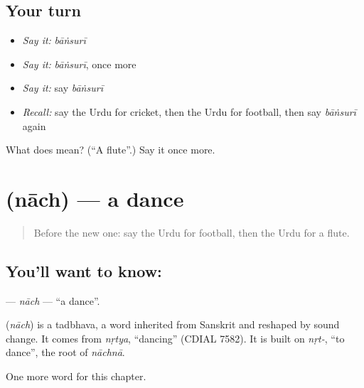 \subsection*{Your turn}
\begin{itemize}
\raggedright
  \item \emph{Say it:} \emph{bāṅsurī}
  \item \emph{Say it:} \emph{bāṅsurī}, once more
  \item \emph{Say it:} say \emph{bāṅsurī}
  \item \emph{Recall:} say the Urdu for cricket, then the Urdu for football, then say \emph{bāṅsurī} again
\end{itemize}

\begin{tcolorbox}[breakable,colback=teal!4,colframe=teal!35!black,title={Before you move on}]
What does  mean? (\textquotedblleft{}A flute\textquotedblright{}.) Say it once more.
\end{tcolorbox}
\section[\texorpdfstring{\ur{ناچ} (nāch)}{ناچ (nāch)}]{ (nāch) — a dance}

\label{lesson:UR-C169-nach}



\begin{quote}
Before the new one: say the Urdu for football, then the Urdu for a flute.
\end{quote}

\subsection*{You'll want to know: }
\textbf{} — \emph{nāch} — \textquotedblleft{}a dance\textquotedblright{}.

\begin{cousinweb}
\textbf{} (\emph{nāch}) is a tadbhava, a word inherited from Sanskrit and reshaped by sound change. It comes from \emph{nṛtya}, \textquotedblleft{}dancing\textquotedblright{} (CDIAL 7582). It is built on \emph{nṛt-}, \textquotedblleft{}to dance\textquotedblright{}, the root of \emph{nāchnā}.
\end{cousinweb}

\begin{grammarlens}[title={What you've built}]
One more word for this chapter.
\end{grammarlens}

